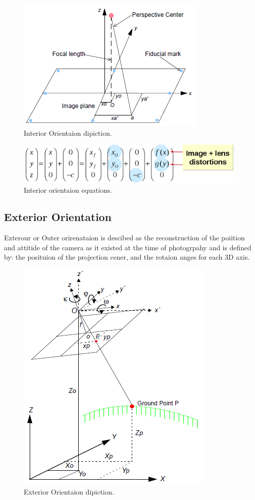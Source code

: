 \documentclass{article}
\begin{document}
\begin{figure}[h!]
\centering
\caption{Interior Orientaion dipiction.}
\includegraphics{interior_diagram}
\end{figure}

\begin{figure}[h!]
\centering
\caption{Interior orientaion equations.}
\includegraphics[scale=0.3]{interior_equations}
\end{figure}

\newpage

\subsection{Exterior Orientation}
Exterour or Outer orirenataion is descibed as the reconstruction of the poiition and attitide of the camera as it existed at the time of
photogrpahy and is defined by: the posituion of the projection cener, and the rotaion anges for each 3D axis.

\begin{figure}[h!]
\centering
\caption{Exterior Orientaion dipiction.}
\includegraphics{exterior_diagram}
\end{figure}
\end{document}
